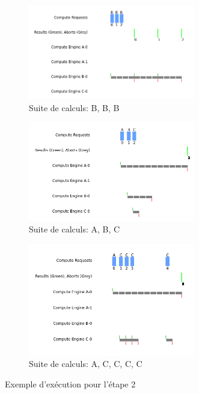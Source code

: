 \documentclass{article}
\begin{document}
\begin{figure}[h]
    \begin{subfigure}{0.45\textwidth}
        \centering
        \includegraphics[width=0.8\textwidth]{figures/B_B_B}
        \caption{Suite de calculs: B, B, B}
    \end{subfigure}
    \begin{subfigure}{0.45\textwidth}
        \centering
        \includegraphics[width=0.8\textwidth]{figures/A_B_C}
        \caption{Suite de calculs: A, B, C}
    \end{subfigure}

    \begin{subfigure}{0.45\textwidth}
        \centering
        \includegraphics[width=0.8\textwidth]{figures/A_C_C_C_C}
        \caption{Suite de calculs: A, C, C, C, C}
    \end{subfigure}
    \caption{Exemple d'exécution pour l'étape 2}
    \label{fig:full2}
\end{figure}
\end{document}
